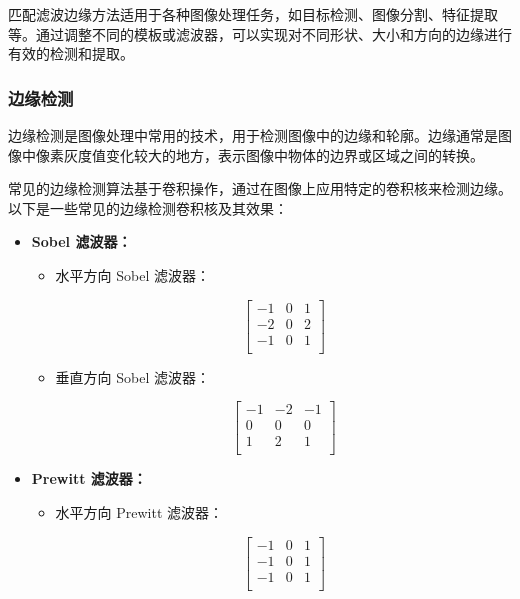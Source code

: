 \documentclass[a4paper,12pt]{article}
\begin{document}
匹配滤波边缘方法适用于各种图像处理任务，如目标检测、图像分割、特征提取等。通过调整不同的模板或滤波器，可以实现对不同形状、大小和方向的边缘进行有效的检测和提取。


\subsubsection{边缘检测}
边缘检测是图像处理中常用的技术，用于检测图像中的边缘和轮廓。边缘通常是图像中像素灰度值变化较大的地方，表示图像中物体的边界或区域之间的转换。

常见的边缘检测算法基于卷积操作，通过在图像上应用特定的卷积核来检测边缘。以下是一些常见的边缘检测卷积核及其效果：

    \begin{itemize}
        \item \textbf{Sobel 滤波器：}
        \begin{itemize}
            \item 水平方向 Sobel 滤波器：
            
            \[
            \begin{bmatrix}
            -1 & 0 & 1 \\
            -2 & 0 & 2 \\
            -1 & 0 & 1 \\
            \end{bmatrix}
            \]
            
            \item 垂直方向 Sobel 滤波器：
            
            \[
            \begin{bmatrix}
            -1 & -2 & -1 \\
            0 & 0 & 0 \\
            1 & 2 & 1 \\
            \end{bmatrix}
            \]
        \end{itemize}
        
        \item \textbf{Prewitt 滤波器：}
        \begin{itemize}
            \item 水平方向 Prewitt 滤波器：
            
            \[
            \begin{bmatrix}
            -1 & 0 & 1 \\
            -1 & 0 & 1 \\
            -1 & 0 & 1 \\
            \end{bmatrix}
            \]
            

\end{itemize}
\end{itemize}
\end{document}

